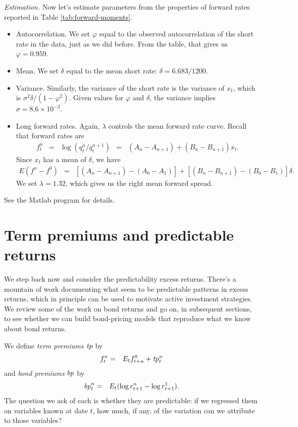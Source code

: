 \documentclass[11pt]{article}
\begin{document}
{\it Estimation.\/}
Now let's estimate parameters from the properties of forward rates
reported in Table \ref{tab:forward-moments}.
%
\begin{itemize}
\item Autocorrelation.
We set $\varphi$ equal to the observed autocorrelation of the short rate in the data,
just as we did before.
From the table, that gives us $\varphi = 0.959$.

\item Mean.  We set $\delta$ equal to the mean short rate:
$\delta = 6.683/1200$.

\item Variance.  Similarly, the variance of the short rate is the variance of $x_t$,
which is $ \sigma^2 \delta/(1-\varphi^2)$.
Given values for $\varphi$ and $\delta$,
the variance implies $\sigma = 8.6\times 10^{-3}$.

\item Long forward rates.  Again,
$\lambda$ controls the mean forward rate curve.
Recall that forward rates are
\begin{eqnarray*}
    f^n_t &=& \log (q^n_t/q^{n+1}_t)
                \;\;=\;\;  (A_n - A_{n+1}) + (B_n - B_{n+1}) x_t .
\end{eqnarray*}
Since $x_t$ has a  mean of $\delta$,  we have
\begin{eqnarray*}
    E (f^n - f^0) &=&  [(A_n - A_{n+1}) - (A_0 - A_{1})] +
        [(B_n - B_{n+1}) - (B_0 - B_{1})] \delta.
\end{eqnarray*}
We set $\lambda=1.32$, which gives us the right mean forward spread.

\end{itemize}
See the Matlab program for details.



\section{Term premiums and predictable returns}

We step back now and consider the predictability excess returns.
There's a mountain of work documenting what seem to be predictable patterns
in excess returns, which in principle can be used to motivate active
investment strategies.
We review some of the work on bond returns and go on, in subsequent sections,
to see whether we can build bond-pricing models that reproduce
what we know about bond returns.


We define {\it term premiums\/} $\mbox{\em tp\/}$ by
\begin{eqnarray}
    f^n_t &=&  E_t f^0_{t+n} + \mbox{\em tp\/}^n_t
    \label{eq:tp}
\end{eqnarray}
and {\it bond premiums\/} $\mbox{\em bp\/}$ by
\begin{eqnarray*}
    \mbox{\em bp\/}^n_t &=& E_t (\log r^n_{t+1}  - \log r^1_{t+1}) .
\end{eqnarray*}
The question we ask of each is whether they are predictable:
if we regressed them on variables known at date $t$,
how much, if any, of the variation can we attribute to those variables?
\end{document}
